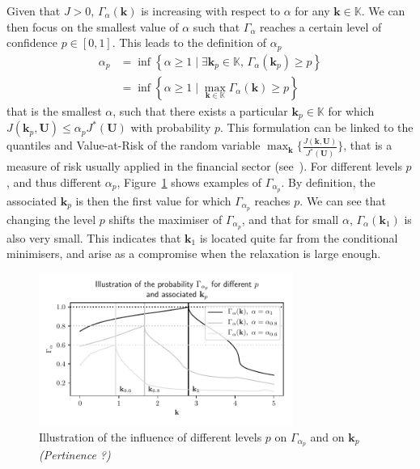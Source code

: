\documentclass[preprint, 1p]{elsarticle}
\newcommand{\checkap}{{\alpha}_p}
\newcommand{\checkkp}{{\mathbf{k}}_p}
\newcommand{\Kspace}{\mathbb{K}}
\newcommand{\victor}[1]{{\itshape\color{green} ({#1})}}
\begin{document}
Given that $J>0$, $\Gamma_{\alpha}(\mathbf{k})$ is increasing with respect to $\alpha$ for any $\mathbf{k}\in\Kspace$. We can then focus on the smallest value of $\alpha$ such that $\Gamma_\alpha$ reaches a certain level of confidence $p\in[0,1]$. This leads to the definition of $\checkap$
\begin{align}
  \checkap &= \inf\left\{ \alpha\geq 1 \mid \exists \checkkp \in \Kspace,\, \Gamma_{\alpha}(\checkkp) \geq p \right\} \nonumber \\
   &= \inf \left\{ \alpha \geq 1 \mid \max_{\mathbf{k}\in\Kspace} \Gamma_{\alpha}(\mathbf{k}) \geq p \right\}   \label{eq:def_alpha_check}
\end{align}
that is the smallest $\alpha$, such that there exists a particular $\checkkp \in \Kspace$ for which $J(\checkkp,\mathbf{U}) \leq \checkap J^*(\mathbf{U})$ with probability $p$. This formulation can be linked to the quantiles and Value-at-Risk of the random variable $\max_{\mathbf{k}} \{ \frac{J(\mathbf{k},\mathbf{U})}{J^*(\mathbf{U})}\}$, that is a measure of risk usually applied in the financial sector (see~\cite{rockafellar_deviation_2002}). For different levels $p$, and thus different $\alpha_p$, Figure~\ref{fig:illu_alpha_p} shows examples of $\Gamma_{\alpha_p}$. By definition, the associated $\mathbf{k}_p$ is then the first value for which $\Gamma_{\alpha_p}$ reaches $p$. We can see that changing the level $p$ shifts the maximiser of $\Gamma_{\alpha_p}$, and that for small $\alpha$, $\Gamma_{\alpha}(\mathbf{k}_1)$ is also very small. This indicates that $\mathbf{k}_1$ is located quite far from the conditional minimisers, and arise as a compromise when the relaxation is large enough.

\begin{figure}[!ht]
\centering
\includegraphics[width = 8.3cm]{Figures/illu_alpha_p.pdf}
\caption{Illustration of the influence of different levels $p$ on $\Gamma_{\alpha_p}$ and on $\mathbf{k}_p$ \victor{Pertinence ?}}
\label{fig:illu_alpha_p}
\end{figure}
\end{document}
